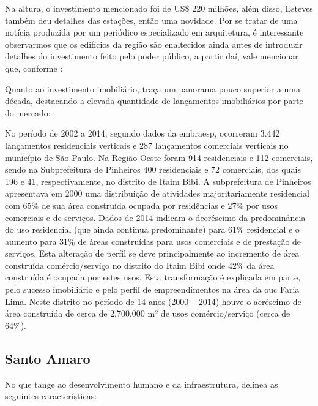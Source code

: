 	Na altura, o investimento mencionado foi de US\$ 220 milhões, além disso, Esteves também deu detalhes das estações, então uma novidade. Por se tratar de uma notícia produzida por um periódico especializado em arquitetura, é interessante observarmos que os edifícios da região são enaltecidos ainda antes de introduzir detalhes do investimento feito pelo poder público, a partir daí, vale mencionar que, conforme \cite{Nobre}:
	
	Quanto ao investimento imobiliário,  traça um panorama pouco superior a uma década, destacando a elevada quantidade de lançamentos imobiliários por parte do mercado:
	
	\begin{citacao}
		No período de 2002 a 2014, segundo dados da \gls{embraesp}, ocorreram 3.442 lançamentos residenciais verticais e 287 lançamentos comerciais verticais no município de São Paulo. Na Região Oeste foram 914 residenciais e 112 comerciais, sendo na Subprefeitura de Pinheiros 400 residenciais e 72 comerciais, dos quais 196 e 41, respectivamente, no distrito de Itaim Bibi. A subprefeitura de Pinheiros apresentava em 2000 uma distribuição de atividades majoritariamente residencial com 65\% de sua área construída ocupada por residências e 27\% por usos comerciais e de serviços. 
		Dados de 2014 indicam o decréscimo da predominância do uso residencial (que ainda continua predominante) para 61\% residencial e o aumento para 31\% de áreas construídas para usos comerciais e de prestação de serviços. Esta alteração de perfil se deve principalmente ao incremento de área construída comércio/serviço no distrito do Itaim Bibi onde 42\% da área construída é ocupada por estes usos. Esta transformação é explicada em parte, pelo sucesso imobiliário e pelo perfil de empreendimentos na área da \gls{ouc} Faria Lima. Neste distrito no período de 14 anos (2000 – 2014) houve o acréscimo de área construída de cerca de 2.700.000 m² de usos comércio/serviço (cerca de 64\%).
	\end{citacao}
	
	\subsection{Santo Amaro} \label{Santo Amaro}
	
	No que tange ao desenvolvimento humano e da infraestrutura,  delinea as seguintes características:
	
